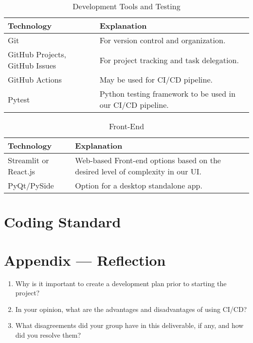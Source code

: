 \documentclass{article}
\begin{document}
\begin{table}[!htbp]
\caption{Development Tools and Testing} \label{TblDevelopmentToolsAndTesting}
\begin{tabularx}{\textwidth}{p{3cm}p{7cm}}
\toprule
\textbf{Technology} & \textbf{Explanation}\\
\midrule
Git & For version control and organization.\\
\addlinespace
GitHub Projects, GitHub Issues & For project tracking and task delegation.\\
\addlinespace
GitHub Actions & May be used for CI/CD pipeline.\\
\addlinespace
Pytest & Python testing framework to be used in our CI/CD pipeline.\\
\bottomrule
\end{tabularx}
\end{table}

\begin{table}[!htbp]
\caption{Front-End} \label{TblFrontEnd}
\begin{tabularx}{\textwidth}{p{3cm}p{7cm}}
\toprule
\textbf{Technology} & \textbf{Explanation}\\
\midrule
Streamlit or React.js & Web-based Front-end options based on the desired level of complexity in our UI.\\
\addlinespace
PyQt/PySide & Option for a desktop standalone app.\\
\bottomrule
\end{tabularx}
\end{table}


\section{Coding Standard}


\newpage{}

\section*{Appendix --- Reflection}




\begin{enumerate}
    \item Why is it important to create a development plan prior to starting the
    project?
    \item In your opinion, what are the advantages and disadvantages of using
    CI/CD?
    \item What disagreements did your group have in this deliverable, if any,
    and how did you resolve them?
\end{enumerate}
\end{document}
